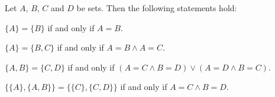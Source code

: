 \begin{theorem}
    Let $A$, $B$, $C$ and $D$ be sets. Then the following statements hold:
    \begin{intheoremenumerate}
        \item $\{A\}=\{B\}$ if and only if $A=B$.
        \item\label{theorem:sets:singleton_equals_pair} $\{A\}=\{B,C\}$ if and only if $A=B\land A=C$.
        \item $\{A,B\}=\{C,D\}$ if and only if $(A=C\land B=D)\lor (A=D\land B=C)$.
        \item\label{theorem:sets:equality_ordered_pairs} $\{\{A\},\{A,B\}\}=\{\{C\},\{C,D\}\}$ if and only if $A=C\land B=D$.
    \end{intheoremenumerate}
\end{theorem}
